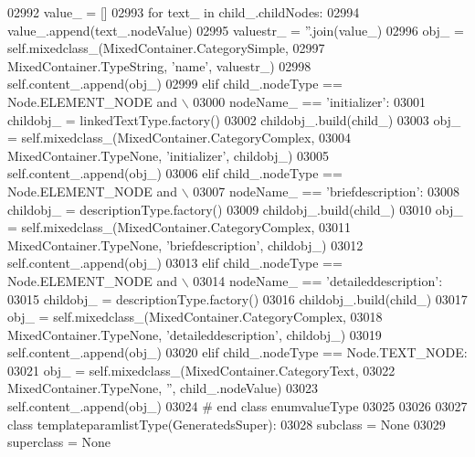 \begin{DoxyCode}
{{{{{{{{{{{{{{{{{{{{{{{{{{{{{{{{{{{{{{{{{{{{{{{{{{{{{{{{{{{{{{{{{{{{{{{{{{{{{{{{{{{{{{{{{{{{{{{{{{{{{{{{{{{{{{{{{{{{{{{{{{{{{{{{{{{{{{{{{{{{{{{{{{{{{{{{{{{{{{{{{{{{{{{{{{{{{{{{{{{{{{{{{{{{{{{{{{{{{{{{{{{02992             value\_ = []
02993             \textcolor{keywordflow}{for} text\_ \textcolor{keywordflow}{in} child\_.childNodes:
02994                 value\_.append(text\_.nodeValue)
02995             valuestr\_ = \textcolor{stringliteral}{''}.join(value\_)
02996             obj\_ = self.mixedclass_(MixedContainer.CategorySimple,
02997                 MixedContainer.TypeString, \textcolor{stringliteral}{'name'}, valuestr\_)
02998             self.content\_.append(obj\_)
02999         \textcolor{keywordflow}{elif} child\_.nodeType == Node.ELEMENT\_NODE \textcolor{keywordflow}{and} \(\backslash\)
03000             nodeName\_ == \textcolor{stringliteral}{'initializer'}:
03001             childobj\_ = linkedTextType.factory()
03002             childobj\_.build(child\_)
03003             obj\_ = self.mixedclass_(MixedContainer.CategoryComplex,
03004                 MixedContainer.TypeNone, \textcolor{stringliteral}{'initializer'}, childobj\_)
03005             self.content\_.append(obj\_)
03006         \textcolor{keywordflow}{elif} child\_.nodeType == Node.ELEMENT\_NODE \textcolor{keywordflow}{and} \(\backslash\)
03007             nodeName\_ == \textcolor{stringliteral}{'briefdescription'}:
03008             childobj\_ = descriptionType.factory()
03009             childobj\_.build(child\_)
03010             obj\_ = self.mixedclass_(MixedContainer.CategoryComplex,
03011                 MixedContainer.TypeNone, \textcolor{stringliteral}{'briefdescription'}, childobj\_)
03012             self.content\_.append(obj\_)
03013         \textcolor{keywordflow}{elif} child\_.nodeType == Node.ELEMENT\_NODE \textcolor{keywordflow}{and} \(\backslash\)
03014             nodeName\_ == \textcolor{stringliteral}{'detaileddescription'}:
03015             childobj\_ = descriptionType.factory()
03016             childobj\_.build(child\_)
03017             obj\_ = self.mixedclass_(MixedContainer.CategoryComplex,
03018                 MixedContainer.TypeNone, \textcolor{stringliteral}{'detaileddescription'}, childobj\_)
03019             self.content\_.append(obj\_)
03020         \textcolor{keywordflow}{elif} child\_.nodeType == Node.TEXT\_NODE:
03021             obj\_ = self.mixedclass_(MixedContainer.CategoryText,
03022                 MixedContainer.TypeNone, \textcolor{stringliteral}{''}, child\_.nodeValue)
03023             self.content\_.append(obj\_)
03024 \textcolor{comment}{# end class enumvalueType}
03025 
03026 
03027 \textcolor{keyword}{class }templateparamlistType(GeneratedsSuper):
03028     subclass = \textcolor{keywordtype}{None}
03029     superclass = \textcolor{keywordtype}{None}
}}}}}}}}}}}}}}}}}}}}}}}}}}}}}}}}}}}}}}}}}}}}}}}}}}}}}}}}}}}}}}}}}}}}}}}}}}}}}}}}}}}}}}}}}}}}}}}}}}}}}}}}}}}}}}}}}}}}}}}}}}}}}}}}}}}}}}}}}}}}}}}}}}}}}}}}}}}}}}}}}}}}}}}}}}}}}}}}}}}}}}}}}}}}}}}}}}}}}}}}}}}
\end{DoxyCode}
